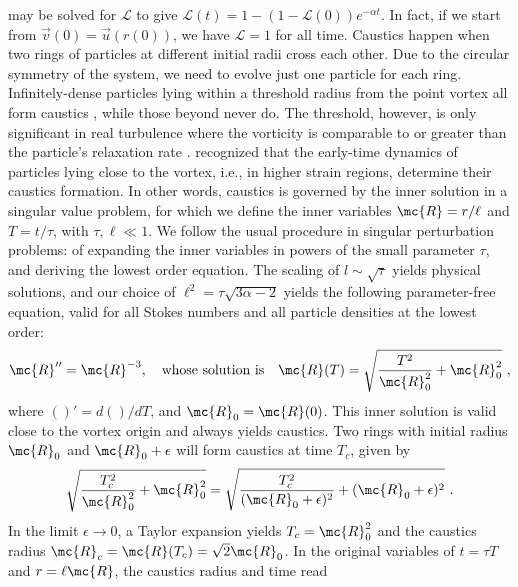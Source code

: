   may be solved for $\mathscr{L}$ to give $\mathscr{L}(t) = 1 - (1 - \mathscr{L}(0))e^{-\alpha t}$. In fact, if we start from $\vec{v}(0) = \vec{u}(r(0))$, we have $\mathscr{L} = 1$ for all time. Caustics happen when two rings of particles at different initial radii cross each other. Due to the circular symmetry of the system, we need to evolve just one particle for each ring. Infinitely-dense particles lying within a threshold radius from the point vortex all form caustics \cite{ravichandran2022}, while those beyond never do. The threshold, however, is only significant in real turbulence where the vorticity is comparable to or greater than the particle's relaxation rate \cite{ling2013}. \citet{ravichandran2015} recognized that the early-time dynamics of particles lying close to the vortex, i.e., in higher strain regions, determine their caustics formation. In other words, caustics is governed by the inner solution in a singular value problem, for which we define the inner variables $ \mc{R}= r/\ell $ and $T = t/\tau$, with $\tau, \ell \ll 1$. 
We follow the usual procedure in singular perturbation problems: of expanding the inner variables in powers of the small parameter $\tau$, and deriving the lowest order equation. The scaling of $l \sim \sqrt\tau$ \cite{deepu2017} yields physical solutions, and our choice of 
$\ell^2 = \tau\sqrt{3\alpha -2}$ yields the following parameter-free equation, valid for all Stokes numbers and all particle densities at the lowest order:
\begin{equation}
   \mc{R}'' = \mc{R}^{-3}, 
\quad {\rm whose \ solution \ is} \quad
\mc{R}(T) = \sqrt{\frac{T^2}{\mc{R}_0^2}+\mc{R}_0^2} \ , 
      \end{equation}
  where $()' = d()/dT$, and $\mc{R}_0 = \mc{R}(0)$. This inner solution is valid close to the vortex origin and always yields caustics. Two rings with initial radius $\mc{R}_0$ and $\mc{R}_0 + \epsilon$ will form caustics at time $T_c$, given by 
  \begin{align}
  \begin{split}
      \sqrt{\frac{T_c^2}{\mc{R}_0^2}+ \mc{R}_0^2} = \sqrt{\frac{T_c^2}{(\mc{R}_0 +\epsilon)^2}+ (\mc{R}_0 +\epsilon)^2} \ .
  \end{split}
  \end{align}
  In the limit $\epsilon \to 0$, a Taylor expansion yields $T_c = \mc{R}_0^2$  and the caustics radius $\mc{R}_c = \mc{R}(T_c)= \sqrt{2}\mc{R}_0$. In the original variables of $t = \tau T$ and $r = \ell \mc{R}$, the caustics radius and time read
